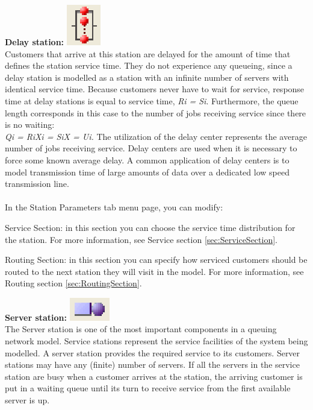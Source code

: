 \begin{enumerate*}
\item \textbf{Delay station:} \includegraphics[scale=1]{img/jsim/delay.eps}\\
Customers that arrive at this station are delayed for the amount of time that defines the station service time. They do not experience any queueing, since a delay station is modelled as a station with an infinite number of servers with identical service time. Because customers never have to wait for service, response time at delay
stations is equal to service time, \emph{Ri = Si}. Furthermore, the queue length corresponds in this case to the number of jobs receiving service since there is no waiting:\\
\emph{Qi = RiXi = SiX = Ui. }
The utilization of the delay center represents the average number of jobs receiving service.
Delay centers are used when it is necessary to force some known average delay. A common application of delay centers is to model
transmission time of large amounts of data over a dedicated low speed transmission line.\\\\
In the Station Parameters tab menu page, you can modify:
\begin{description*}
\item[Service Section:]
in this section you can choose the service time distribution for the station.
For more information, see Service section \ref{sec:ServiceSection}.
\item[Routing Section:]
in this section you can specify how serviced customers should be routed to the next station they will visit in the model.
For more information, see Routing section \ref{sec:RoutingSection}.
\end{description*}
\item \textbf{Server station:} \includegraphics[scale=1]{img/jsim/server.eps}\\
The Server station is one of the most important components in a queuing network model. Service stations represent the service facilities of the system being modelled. A server station provides the required service to its customers. Server stations may have any (finite) number of servers. If all the servers in the service station are busy when a customer arrives at the station, the arriving customer is put in a waiting queue until its turn to receive service from the first available server is up.

\end{enumerate*}
